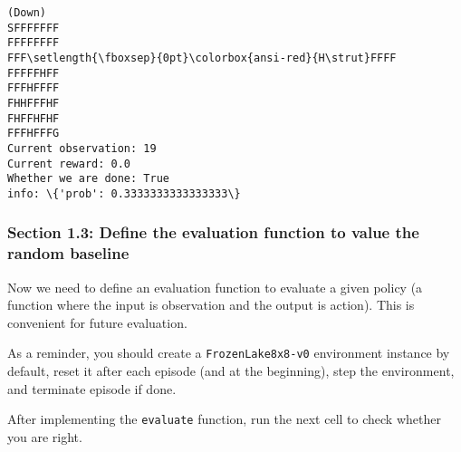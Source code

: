 \documentclass[11pt]{article}
\begin{document}
    \begin{Verbatim}[commandchars=\\\{\}]
  (Down)
SFFFFFFF
FFFFFFFF
FFF\setlength{\fboxsep}{0pt}\colorbox{ansi-red}{H\strut}FFFF
FFFFFHFF
FFFHFFFF
FHHFFFHF
FHFFHFHF
FFFHFFFG
Current observation: 19
Current reward: 0.0
Whether we are done: True
info: \{'prob': 0.3333333333333333\}

    \end{Verbatim}

    \subsubsection{Section 1.3: Define the evaluation function to value the
random
baseline}\label{section-1.3-define-the-evaluation-function-to-value-the-random-baseline}

Now we need to define an evaluation function to evaluate a given policy
(a function where the input is observation and the output is action).
This is convenient for future evaluation.

As a reminder, you should create a \texttt{FrozenLake8x8-v0} environment
instance by default, reset it after each episode (and at the beginning),
step the environment, and terminate episode if done.

After implementing the \texttt{evaluate} function, run the next cell to
check whether you are right.
\end{document}
